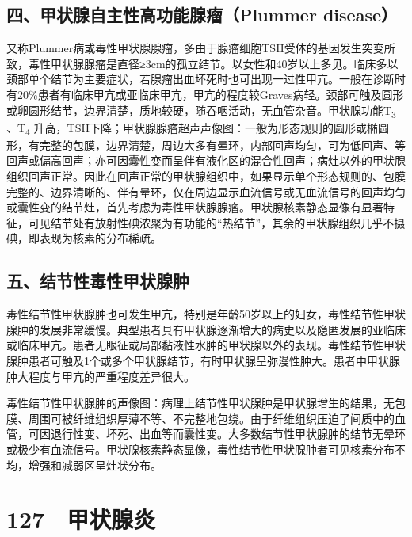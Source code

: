 \protect\hypertarget{text00301.html}{}{}

\subsection{四、甲状腺自主性高功能腺瘤（Plummer disease）}

又称Plummer病或毒性甲状腺腺瘤，多由于腺瘤细胞TSH受体的基因发生突变所致，毒性甲状腺腺瘤是直径≥3cm的孤立结节。以女性和40岁以上多见。临床多以颈部单个结节为主要症状，若腺瘤出血坏死时也可出现一过性甲亢。一般在诊断时有20\%患者有临床甲亢或亚临床甲亢，甲亢的程度较Graves病轻。颈部可触及圆形或卵圆形结节，边界清楚，质地较硬，随吞咽活动，无血管杂音。甲状腺功能T\textsubscript{3}
、T\textsubscript{4}
升高，TSH下降；甲状腺腺瘤超声声像图：一般为形态规则的圆形或椭圆形，有完整的包膜，边界清楚，周边大多有晕环，内部回声均匀，可为低回声、等回声或偏高回声；亦可因囊性变而呈伴有液化区的混合性回声；病灶以外的甲状腺组织回声正常。因此在回声正常的甲状腺组织中，如果显示单个形态规则的、包膜完整的、边界清晰的、伴有晕环，仅在周边显示血流信号或无血流信号的回声均匀或囊性变的结节灶，首先考虑为毒性甲状腺腺瘤。甲状腺核素静态显像有显著特征，可见结节处有放射性碘浓聚为有功能的“热结节”，其余的甲状腺组织几乎不摄碘，即表现为核素的分布稀疏。

\protect\hypertarget{text00302.html}{}{}

\subsection{五、结节性毒性甲状腺肿}

毒性结节性甲状腺肿也可发生甲亢，特别是年龄50岁以上的妇女，毒性结节性甲状腺肿的发展非常缓慢。典型患者具有甲状腺逐渐增大的病史以及隐匿发展的亚临床或临床甲亢。患者无眼征或局部黏液性水肿的甲状腺以外的表现。毒性结节性甲状腺肿患者可触及1个或多个甲状腺结节，有时甲状腺呈弥漫性肿大。患者中甲状腺肿大程度与甲亢的严重程度差异很大。

毒性结节性甲状腺肿的声像图：病理上结节性甲状腺肿是甲状腺增生的结果，无包膜、周围可被纤维组织厚薄不等、不完整地包绕。由于纤维组织压迫了间质中的血管，可因退行性变、坏死、出血等而囊性变。大多数结节性甲状腺肿的结节无晕环或极少有血流信号。甲状腺核素静态显像，毒性结节性甲状腺肿者可见核素分布不均，增强和减弱区呈灶状分布。

\protect\hypertarget{text00303.html}{}{}

\section{127　甲状腺炎}

